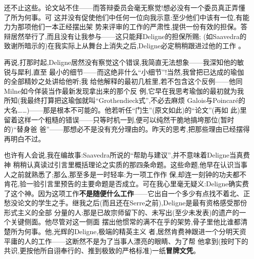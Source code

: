 还不止这些。论文站不住——而答辩委员会毫无察觉!想必没有一个委员真正弄懂了所为何事。可
这并没有促使他们中任何一位向我示意:至少他们中该有一位,有能力为那项他们一本正经摆出架
势来评审的工作的严肃性,提供一份有效的担保。答辩居然举行了,而且没有让我参与——这只能拜Deligne的担保所赐;
(如Saavedra的致谢所暗示的)在我实际上从舞台上消失之后,Deligne必定稍稍跟进过他的工作
。

再说,打那时起,Deligne居然没有察觉这个错误,我简直无法想象——我深知他的敏锐与犀利,直至
最小的细节——而这绝非什么“小细节”!当然,我曾把已达成的瑜伽的全部精妙之处讲给他听;我
给他解释的最初几桩里,若不包含这个反例——他同Milne如今佯装当作最新发现拿出来的那个反
例,它早在我思考瑜伽的最初就为我所知(我最终打算把这瑜伽就叫“Grothendieck式”,不必去麻烦
Galois与Poincaré的大名……)——那是根本不可能的。他若听任“门生”(原文如此)的“论文”(再如
此)里留着这样一个粗糙的错误——只等时机一到,便可以纯然干脆地搞垮那位(暂时的)“替身爸
爸”——那想必不是没有充分理由的。昨天的思考,把那些理由已经摆得再明白不过。

\pmark{}也许有人会说,我在编故事:Saavedra所说的“帮助与建议”,并不意味着Deligne当真费神
稍稍认真读过引言里概括理论之实质的那四条命题。这些命题,他早在认识当事人之前就熟悉了;那么,那至多是一时轻率:为一项工作作
保,却连一刻钟的功夫都不肯花,验一验引言里预告的主要命题是否成立。可在我心里毫无疑义:Deligne确实费了这个神。因为这项工作\textbf{不是随便什么工作}——它出自一个多少有点找不着北、正
愁没论文的学生之手。继我之后(而且还在Serre之前),Deligne是最有资格感受那份形式主义的全部
分量的人:那是已故宗师留下的、未写出(至少未发表)的遗产的一个关键侧面。他尽管对这一侧面
摆出他惯常的满不在乎的架势,骨子里他比谁都清楚所为何事。他,光辉的Deligne,极端的精英主义
者,居然肯费神跟进一个分明天资平庸的人的工作——这断然不是为了当事人漂亮的眼睛、为了帮
他拿到(按时下的共识,更按他所自诩奉行的、推到极致的严格标准)一纸\textbf{冒牌文凭}。

